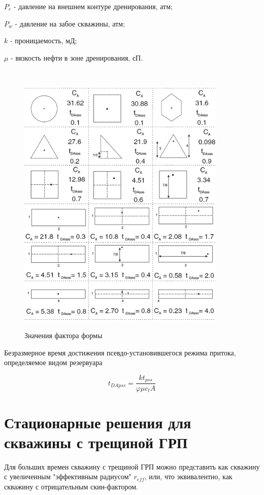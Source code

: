 $P_e$ - давление на внешнем контуре дренирования, атм;

$P_w$ - давление на забое скважины, атм;

$k$ - проницаемость, мД;

$\mu$ - вязкость нефти в зоне дренирования, сП.

\

\begin{figure}[h!]
	\centering
	\includegraphics[width= 10cm]{pics/shape_factors.png} 
	\label{fig:shape_factors}
	\caption{Значения фактора формы}
\end{figure}


Безразмерное время достижения псевдо-установившегося режима притока, определяемое видом резервуара

$$t_{DApss} = \frac{kt_{pss}}{\varphi \mu c_t A} $$

\section{Стационарные решения для скважины с трещиной ГРП}

Для больших времен скважину с трещиной ГРП можно представить как скважину с увеличенным "эффективным радиусом" $r_{eff}$, или, что эквивалентно, как скважину с отрицательным скин-фактором.

